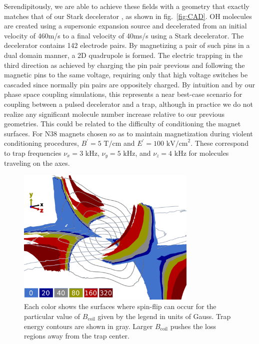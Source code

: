 \documentclass[%
 reprint,
 amsmath,amssymb,
 aps,
prl,
]{revtex4-1}
\begin{document}
Serendipitously, we are able to achieve these fields with a geometry that exactly matches that of our Stark decelerator \cite{Bochinski2003}, as shown in fig.~\ref{fig:CAD}. OH molecules are created using a supersonic expansion source and decelerated from an initial velocity of 460m/s to a final velocity of 40ms/s using a Stark decelerator. The decelerator contains 142 electrode pairs. By magnetizing a pair of such pins in a dual domain manner, a 2D quadrupole is formed. The electric trapping in the third direction as achieved by charging the pin pair previous and following the magnetic pins to the same voltage, requiring only that high voltage switches be cascaded since normally pin pairs are oppositely charged. By intuition and by our phase space coupling simulations, this represents a near best-case scenario for coupling between a pulsed decelerator and a trap, although in practice we do not realize any significant molecule number increase relative to our previous geometries. This could be related to the difficulty of conditioning the magnet surfaces. For N38 magnets chosen so as to maintain magnetization during violent conditioning procedures, $B^\prime=5\text{ T/cm}$ and $E^\prime=100 \text{ kV/cm}^2$. These correspond to trap frequencies $\nu_x=3\text{ kHz}$, $\nu_y=5\text{ kHz}$, and $\nu_z=4\text{ kHz}$ for molecules traveling on the axes.

\begin{figure}
\includegraphics[width=86mm]{LossSurfaces/Loss_Surface_Chunks_recolored_legend.png}%
\caption{
Each color shows the surfaces where spin-flip can occur for the particular value of $B_\text{coil}$ given by the legend in units of Gauss. Trap energy contours are shown in gray. Larger $B_\text{coil}$ pushes the loss regions away from the trap center.
\label{fig:LSurfs}}
\end{figure}
\end{document}
